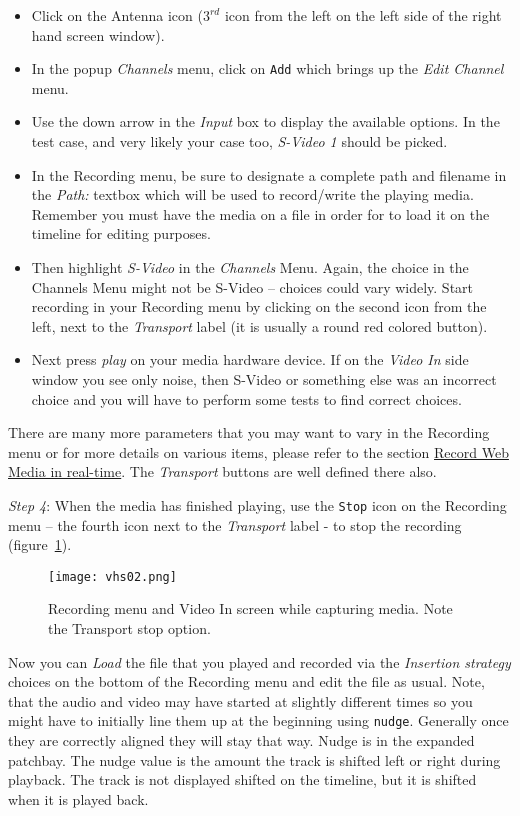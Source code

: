 \begin{itemize}
    \item Click on the Antenna icon ($3^{rd}$ icon from the left on the left side of the right hand screen window).
    \item In the popup \textit{Channels} menu, click on \texttt{Add} which brings up the \textit{Edit Channel} menu.
    \item Use the down arrow in the \textit{Input} box to display the available options.  In the test case, and very likely your case too, \textit{S-Video 1} should be picked.
    \item In the Recording menu, be sure to designate a complete path and filename in the \textit{Path:} textbox which will be used to record/write the playing media.  Remember you must have the media on a file in order for \CGG{} to load it on the timeline for editing purposes.
    \item Then highlight \textit{S-Video} in the \textit{Channels} Menu.  Again, the choice in the Channels Menu might not be S-Video -- choices could vary widely. Start recording in your Recording menu by clicking on the second icon from the left, next to the \textit{Transport} label (it is usually a round red colored button).
    \item Next press \textit{play} on your media hardware device.  If on the \textit{Video In} side window you see only noise, then S-Video or something else was an incorrect choice and you will have to perform some tests to find correct choices.
\end{itemize}

There are many more parameters that you may want to vary in the Recording menu or for more details on various items, please refer to the section \hyperref[sec:record_web_media_rt]{Record Web Media in real-time}. The \textit{Transport} buttons are well defined there also.

\textit{Step 4}: When the media has finished playing, use the \texttt{Stop} icon on the Recording menu – the fourth icon next to the \textit{Transport} label - to stop the recording (figure~\ref{fig:vhs02}).

\begin{figure}[htpb]
    \centering
    \texttt{[image: vhs02.png]}
    \caption{Recording menu and Video In screen while capturing media.  Note the Transport stop option.}
    \label{fig:vhs02}
\end{figure}

Now you can \textit{Load} the file that you played and recorded via the \textit{Insertion strategy} choices on the bottom of the Recording menu and edit the file as usual.  Note, that the audio and video may have started at slightly different times so you might have to initially line them up at the beginning using \texttt{nudge}.  Generally once they are correctly aligned they will stay that way.  Nudge is in the expanded patchbay. The nudge value is the amount the track is shifted left or right during playback. The track is not displayed shifted on the timeline, but it is shifted when it is played back.

